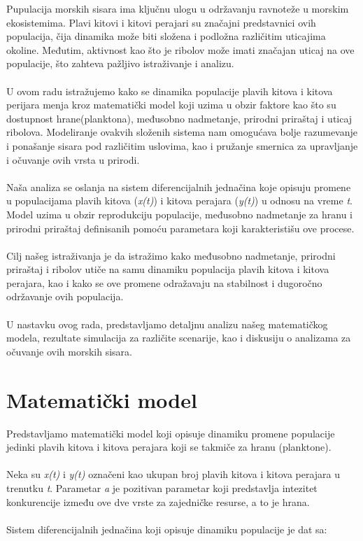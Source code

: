 \documentclass[a4paper]{article}
\begin{document}
{	Pupulacija morskih sisara ima ključnu ulogu u održavanju ravnoteže u morskim ekosistemima. Plavi kitovi i kitovi perajari su značajni predstavnici ovih populacija, čija dinamika može biti složena i podložna različitim uticajima okoline. Međutim, aktivnost kao što je ribolov može imati značajan uticaj na ove populacije, što zahteva pažljivo istraživanje i analizu. \\
	\\
	U ovom radu istražujemo kako se dinamika populacije plavih kitova i kitova perijara menja kroz matematički model koji uzima u obzir faktore kao što su dostupnost hrane(planktona), međusobno nadmetanje, prirodni priraštaj i uticaj ribolova. Modeliranje ovakvih složenih sistema nam omogućava bolje razumevanje i ponašanje sisara pod različitim uslovima, kao i pružanje smernica za upravljanje i očuvanje ovih vrsta u prirodi.  \\ 
	\\
	Naša analiza se oslanja na sistem diferencijalnih jednačina koje opisuju promene u populacijama plavih kitova (\textit{x(t)}) i kitova perajara (\textit{y(t)}) u odnosu na vreme \textit{t}. Model uzima u obzir reprodukciju populacije, međusobno nadmetanje za hranu i prirodni priraštaj definisanih pomoću parametara koji karakteristišu ove procese. \\
	\\
	Cilj našeg istraživanja je da istražimo kako međusobno nadmetanje, prirodni priraštaj i ribolov utiče na samu dinamiku populacija plavih kitova i kitova perajara, kao i kako se ove promene odražavaju na stabilnost i dugoročno održavanje ovih populacija. \\ 
	\\ 
	U nastavku ovog rada, predstavljamo detaljnu analizu našeg matematičkog modela, rezultate simulacija za različite scenarije, kao i diskusiju o analizama za očuvanje ovih morskih sisara.
	
	\section{Matematički model}
	\label{sec: matematocki-model}
	
	Predstavljamo matematički model koji opisuje dinamiku promene populacije jedinki plavih kitova i kitova perajara koji se takmiče za hranu (planktone). \\
	\\
	Neka su \textit{x(t)} i \textit{y(t)} označeni kao ukupan broj plavih kitova i kitova perajara u trenutku \textit{t}. Parametar \textit{a} je pozitivan parametar koji predstavlja intezitet konkurencije između ove dve vrste za zajedničke resurse, a to je hrana. \\ 
	\\ 
	Sistem diferencijalnih jednačina koji opisuje dinamiku populacije je dat sa: \\
	
}
\end{document}
